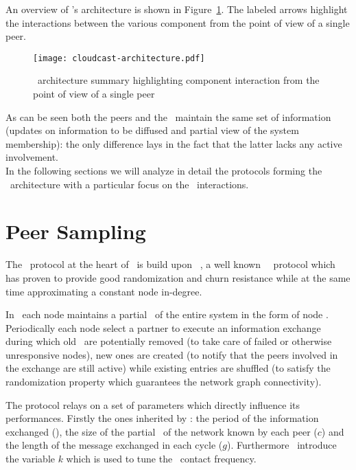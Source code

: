 An overview of \cloudcast's architecture is shown in
Figure~\ref{fig:cloudcast-architecture}. The labeled arrows highlight the
interactions between the various component from the point of view of a
single peer.

\begin{figure}
  \texttt{[image: cloudcast-architecture.pdf]}
  \caption{\cloudcast\ architecture summary highlighting component
    interaction from the point of view of a single peer}
  \label{fig:cloudcast-architecture}
\end{figure}

As can be seen both the peers and the \cloud\ maintain the same set of
information (updates on information to be diffused and partial view of
the system membership): the only difference lays in the fact that the latter
lacks any active involvement.
\ \\
In the following sections we will analyze in detail the protocols
forming the \cloudcast\ architecture with a particular focus on the
\cloud\ interactions.

\section{Peer Sampling}
The \peersampling\ protocol at the heart of \cloudcast\ is build upon
\cyclon\ \cite{CYCLON}, a well known \peersampling\ \gossip\ protocol
which has proven to provide good randomization and churn resistance
while at the same time approximating a constant node in-degree.

In \cloudcast\ each node maintains a partial \view\ of the entire system
in the form of node \descriptors. Periodically each node select
a partner to execute an information exchange during which old
\descriptors\ are potentially removed (to take care of failed or
otherwise unresponsive nodes), new ones are created (to notify that the
peers involved in the exchange are still active) while existing
entries are shuffled (to satisfy the randomization property which
guarantees the network graph connectivity).

The protocol relays on a set of parameters which directly influence its
performances. Firstly the ones inherited by \cyclon: the period of
the information exchanged (\deltacyclon), the size of the partial
\view\ of the network known by each peer ($c$) and the length
of the message exchanged in each cycle ($g$). Furthermore
\cloudcast\ introduce the variable $k$ which is used to tune the
\cloud\ contact frequency.

